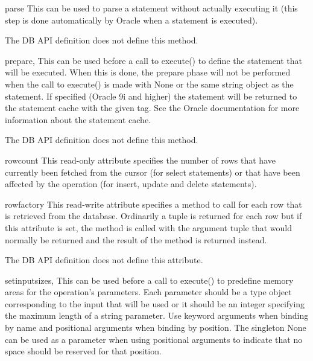 \documentclass{manual}
\begin{document}
\begin{funcdesc}{parse}{}
  This can be used to parse a statement without actually executing it (this
  step is done automatically by Oracle when a statement is executed).

   The DB API definition does not define this method.
\end{funcdesc}

\begin{funcdesc}{prepare}{, }
  This can be used before a call to execute() to define the statement that will
  be executed. When this is done, the prepare phase will not be performed when
  the call to execute() is made with None or the same string object as the
  statement. If specified (Oracle 9i and higher) the statement will be
  returned to the statement cache with the given tag. See the Oracle
  documentation for more information about the statement cache.

   The DB API definition does not define this method.
\end{funcdesc}

\begin{datadesc}{rowcount}
  This read-only attribute specifies the number of rows that have currently
  been fetched from the cursor (for select statements) or that have been
  affected by the operation (for insert, update and delete statements).
\end{datadesc}

\begin{datadesc}{rowfactory}
  This read-write attribute specifies a method to call for each row that is
  retrieved from the database. Ordinarily a tuple is returned for each row but
  if this attribute is set, the method is called with the argument tuple that
  would normally be returned and the result of the method is returned instead.

   The DB API definition does not define this attribute.
\end{datadesc}

\begin{funcdesc}{setinputsizes}{, }
  This can be used before a call to execute() to predefine memory areas for the
  operation's parameters. Each parameter should be a type object corresponding
  to the input that will be used or it should be an integer specifying the
  maximum length of a string parameter. Use keyword arguments when binding by
  name and positional arguments when binding by position. The singleton None
  can be used as a parameter when using positional arguments to indicate that
  no space should be reserved for that position.
\end{funcdesc}
\end{document}
